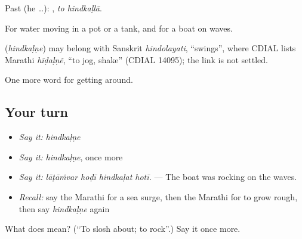 Past (he …):  , \emph{to hindkaḷlā}.

For water moving in a pot or a tank, and for a boat on waves.

\begin{cousinweb}
\textbf{} (\emph{hindkaḷṇe}) may belong with Sanskrit \emph{hindolayati}, \textquotedblleft{}swings\textquotedblright{}, where CDIAL lists Marathi \emph{hĩḍaḷṇẽ}, \textquotedblleft{}to jog, shake\textquotedblright{} (CDIAL 14095); the link is not settled.
\end{cousinweb}

\begin{grammarlens}[title={What you've built}]
One more word for getting around.
\end{grammarlens}

\subsection*{Your turn}
\begin{itemize}
\raggedright
  \item \emph{Say it:} \emph{hindkaḷṇe}
  \item \emph{Say it:} \emph{hindkaḷṇe}, once more
  \item \emph{Say it:} \emph{lāṭāṁvar hoḍī hindkaḷat hotī.} — The boat was rocking on the waves.
  \item \emph{Recall:} say the Marathi for a sea surge, then the Marathi for to grow rough, then say \emph{hindkaḷṇe} again
\end{itemize}

\begin{tcolorbox}[breakable,colback=teal!4,colframe=teal!35!black,title={Before you move on}]
What does  mean? (\textquotedblleft{}To slosh about; to rock\textquotedblright{}.) Say it once more.
\end{tcolorbox}
